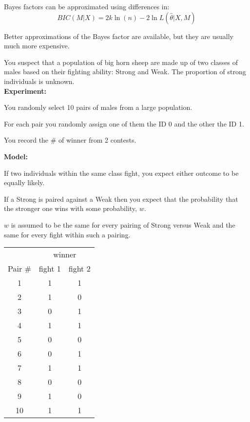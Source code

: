 \documentclass[landscape]{foils}
\begin{document}
\myNewSlide
Bayes factors can be approximated using differences in:
  $$BIC(M|X) = 2k\ln(n) - 2 \ln L(\hat\theta | X, M)$$

Better approximations of the Bayes factor are available, but they are usually much more expensive.


\myNewSlide
\normalsize
You suspect that a population of big horn sheep are made up of two classes of males based on their fighting ability: Strong and Weak. The proportion of strong individuals is unknown.\\ {\bf Experiment:}
\begin{compactitem}
  \item You randomly select 10 pairs of males from a large population. 
  \item For each pair you randomly assign one of them the ID 0 and the other the ID 1.  
  \item You record the \# of winner from 2 contests.
\end{compactitem}
{\bf Model:}
\begin{compactitem}
  \item If two individuals within the same class fight, you expect either outcome to be equally likely.
  \item If a Strong is paired against a Weak then you expect that the probability that the stronger one wins with some probability, $w$.
  \item $w$ is assumed to be the same for every pairing of Strong {versus} Weak and the same for every fight within such a pairing.
\end{compactitem}

\myNewSlide
\begin{center}
\begin{tabular}{|c|c|c|}
\hline
& \multicolumn{2}{c|}{winner}\\
Pair \# & fight 1 & fight 2 \\
\hline
1 & 1 & 1  \\
\hline
2 & 1 & 0  \\
\hline
3 & 0 & 1  \\
\hline
4 & 1 & 1  \\
\hline
5 & 0 & 0  \\
\hline
6 & 0 & 1   \\
\hline
7 & 1 & 1  \\
\hline
8 & 0 & 0  \\
\hline
9 & 1 & 0  \\
\hline
10 & 1 & 1   \\
\hline
\end{tabular}
\end{center}
\end{document}
